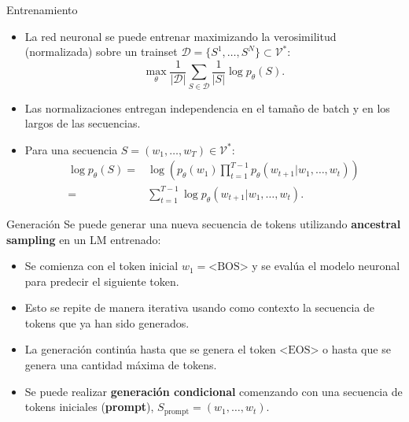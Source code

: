 \documentclass{beamer}
\begin{document}
\begin{frame}{Entrenamiento}
    \begin{itemize}
        \item  La red neuronal se puede entrenar maximizando la verosimilitud (normalizada) sobre un trainset $\mathcal{D}=\{S^1,\ldots,S^N\}\subset\mathcal{V}^*$:
              \begin{equation*}
                  \max_\theta \frac{1}{|\mathcal{D}|}\sum_{S\in\mathcal{D}} \frac{1}{|S|}\log p_\theta(S).
              \end{equation*}
        \item Las normalizaciones entregan independencia en el tamaño de batch y en los largos de las secuencias.
        \item Para una secuencia $S=(w_1,\ldots,w_T)\in\mathcal{V}^*$:
              \begin{align*}
                  \log p_\theta(S)
                  = & \log\left(p_\theta(w_1)\prod_{t=1}^{T-1} p_\theta(w_{t+1}|w_1,\ldots,w_t)\right) \\
                  = & \sum_{t=1}^{T-1} \log p_\theta(w_{t+1}|w_1,\ldots,w_t).
              \end{align*}
    \end{itemize}
\end{frame}

\begin{frame}{Generación}
    Se puede generar una nueva secuencia de tokens utilizando \textbf{ancestral sampling} en un LM entrenado:
    \begin{itemize}
        \item Se comienza con el token inicial $w_1=\text{<BOS>}$ y se evalúa el modelo neuronal para predecir el siguiente token.
        \item Esto se repite de manera iterativa usando como contexto la secuencia de tokens que ya han sido generados.
        \item La generación continúa hasta que se genera el token $\text{<EOS>}$ o hasta que se genera una cantidad máxima de tokens.
        \item Se puede realizar \textbf{generación condicional} comenzando con una secuencia de tokens iniciales (\textbf{prompt}), $S_\text{prompt}=(w_1,\ldots,w_t)$.
    \end{itemize}
\end{frame}
\end{document}
